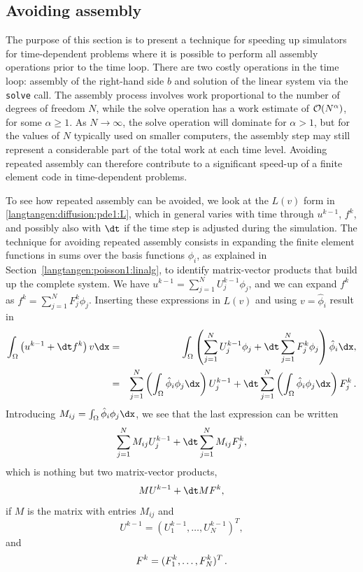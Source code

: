 \subsection{Avoiding assembly}
\label{langtangen:timedep:diffusion1:noassemble}

The purpose of this section is to present a technique for speeding
up \fenics{} simulators for time-dependent problems where it is
possible to perform all assembly operations prior to the time loop.
There are two costly operations in the time loop: assembly of the
right-hand side $b$ and solution of the linear system via the
{\fontsize{10pt}{10pt}\texttt{solve}} call. The assembly process involves work proportional to
the number of degrees of freedom $N$, while the solve operation
has a work estimate of ${\cal O}( N^{\alpha})$, for some $\alpha\geq 1$. As
$N\rightarrow\infty$, the solve operation will dominate for $\alpha>1$,
but for the values of $N$ typically used on smaller computers, the
assembly step may still 
represent a considerable part of the total work at each
time level. Avoiding repeated assembly can therefore contribute to a
significant speed-up of a finite element code in time-dependent problems.

To see how repeated assembly can be avoided, we look at the $L(v)$
form in \eqref{langtangen:diffusion:pde1:L}, which in general varies with
time through $u^{k-1}$, $f^k$, and possibly also with ${\dt}$
if the time step is adjusted during the simulation.
The technique for avoiding repeated assembly consists in
expanding the finite element functions in sums over the basis functions
$\phi_i$, as explained
in Section~\ref{langtangen:poisson1:linalg}, to identify matrix-vector
products that build up the complete system. We have
$u^{k-1}=\sum_{j=1}^NU^{k-1}_j\phi_j$, and we can expand $f^k$ as
$f^{k}=\sum_{j=1}^NF^{k}_j\phi_j$. Inserting these expressions in $L(v)$
and using
$v=\hat\phi_i$ result in
\begin{eqnarray*}
\int_\Omega \left(u^{k-1} + {\dt}f^k\right)v\dx &=&
\int_\Omega \left(\sum_{j=1}^N U^{k-1}_j\phi_j + {\dt}\sum_{j=1}^N F^{k}_j\phi_j\right)\hat\phi_i\dx,\\
&=&\sum_{j=1}^N\left(\int_\Omega \hat\phi_i\phi_j\dx\right)U^{k-1}_j
 + {\dt}\sum_{j=1}^N\left(\int_\Omega \hat\phi_i\phi_j\dx\right)F^{k}_j\langtangenep
\end{eqnarray*}
Introducing $M_{ij} = \int_\Omega \hat\phi_i\phi_j\dx$, we see that
the last expression can be written
\[ \sum_{j=1}^NM_{ij}U^{k-1}_j + {\dt} \sum_{j=1}^NM_{ij}F^{k}_j,\]
which is nothing but two matrix-vector products,
\[ MU^{k-1} + {\dt} MF^k,\]
if $M$ is the matrix with entries $M_{ij}$ and
\[U^{k-1}=(U^{k-1}_1,\ldots,U^{k-1}_N)^T,\] 
and 
\[ F^k=(F^{k}_1,\ldots,F^{k}_N)^T\thinspace .\]


